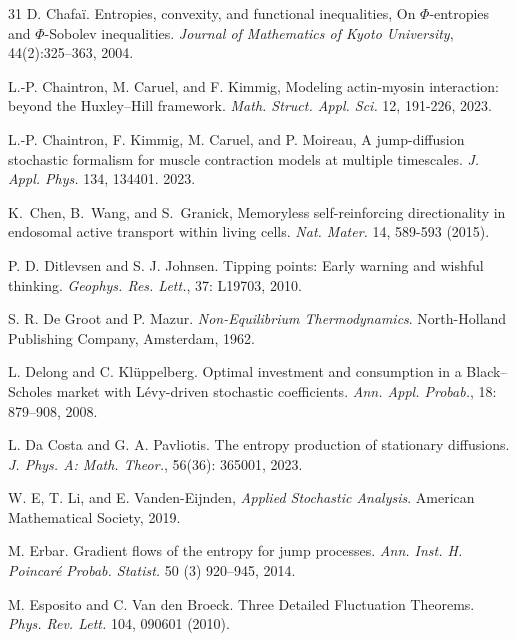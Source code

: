 \documentclass[10pt]{article}
\theoremstyle{definition}
\numberwithin{equation}{section}
\begin{document}
\begin{thebibliography}{31}
 D. Chafa\"{i}.  Entropies, convexity, and functional inequalities, On $\Phi $-entropies and $\Phi $-Sobolev inequalities. {\it  Journal of Mathematics of Kyoto University}, 44(2):325--363, 2004.

L.-P. Chaintron, M. Caruel, and F. Kimmig,
Modeling actin-myosin interaction: beyond the Huxley–Hill framework.
\textit{Math. Struct. Appl. Sci.} 12, 191-226, 2023.

L.-P. Chaintron, F. Kimmig, M. Caruel, and P. Moireau,
A jump-diffusion stochastic formalism for muscle contraction models at multiple timescales.
\textit{J. Appl. Phys.} 134, 134401. 2023.

K.~Chen, B.~Wang, and S.~Granick,
Memoryless self-reinforcing directionality in endosomal active transport within living cells.
\textit{Nat. Mater.} 14, 589-593 (2015).



 P. D. Ditlevsen and S. J. Johnsen. Tipping points: Early warning and wishful thinking. {\it Geophys. Res. Lett.}, 37: L19703, 2010.

 S. R. De Groot and P. Mazur. {\it Non-Equilibrium Thermodynamics}. North-Holland Publishing Company, Amsterdam, 1962.

 L. Delong and C. Kl\"{u}ppelberg. Optimal investment and consumption in a Black--Scholes market with L\'{e}vy-driven stochastic coefficients. {\it Ann. Appl. Probab.}, 18: 879--908, 2008.

 L. Da Costa and G. A. Pavliotis. The entropy production of stationary diffusions. {\it J. Phys. A: Math. Theor.}, 56(36): 365001, 2023.

W. E, T. Li, and E. Vanden-Eijnden,
\textit{Applied Stochastic Analysis}. American Mathematical Society, 2019.

M. Erbar. Gradient flows of the entropy for jump processes. {\it Ann. Inst. H. Poincaré Probab. Statist.} 50 (3) 920--945, 2014.

M. Esposito and C. Van den Broeck.
Three Detailed Fluctuation Theorems.
\textit{Phys. Rev. Lett.} 104, 090601 (2010).


\end{thebibliography}
\end{document}
